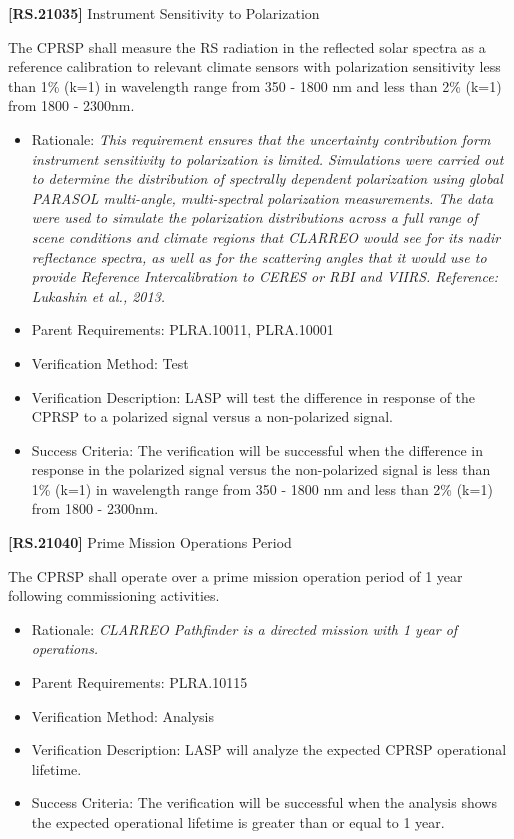 \textbf{[RS.21035]} Instrument Sensitivity to Polarization

The \gls{CPRSP} shall \gls{measure} the \gls{RS} radiation in the reflected solar spectra as a reference calibration to relevant climate sensors with polarization sensitivity less than 1\% (k=1) in wavelength range from 350 - 1800 nm and less than 2\% (k=1) from 1800 - 2300nm.

\begin{itemize}
\item{} Rationale: \emph{This requirement ensures that the uncertainty contribution form instrument sensitivity to polarization is limited. Simulations were carried out to determine the distribution of spectrally dependent polarization using global PARASOL multi-angle, multi-spectral polarization measurements. The data were used to simulate the polarization distributions across a full range of scene conditions and climate regions that CLARREO would see for its nadir reflectance spectra, as well as for the scattering angles that it would use to provide Reference Intercalibration to CERES or RBI and VIIRS. Reference: Lukashin et al., 2013.}

\item{} Parent Requirements: PLRA.10011, PLRA.10001

\item{} Verification Method: Test

\item{} Verification Description: \gls{LASP} will \gls{test} the difference in response of the \gls{CPRSP} to a polarized signal versus a non-polarized signal.

\item{} Success Criteria: The verification will be successful when the difference in response in the polarized signal versus the non-polarized signal is less than 1\% (k=1) in wavelength range from 350 - 1800 nm and less than 2\% (k=1) from 1800 - 2300nm.

\end{itemize}

\textbf{[RS.21040]} Prime Mission Operations Period

The \gls{CPRSP} shall operate over a prime mission operation period of 1 year following commissioning activities.

\begin{itemize}
\item{} Rationale: \emph{CLARREO Pathfinder is a directed mission with 1 year of operations.}

\item{} Parent Requirements: PLRA.10115

\item{} Verification Method: Analysis

\item{} Verification Description: \gls{LASP} will analyze the expected \gls{CPRSP} operational lifetime.

\item{} Success Criteria: The verification will be successful when the \gls{analysis} shows the expected operational lifetime is greater than or equal to 1 year.

\end{itemize}

